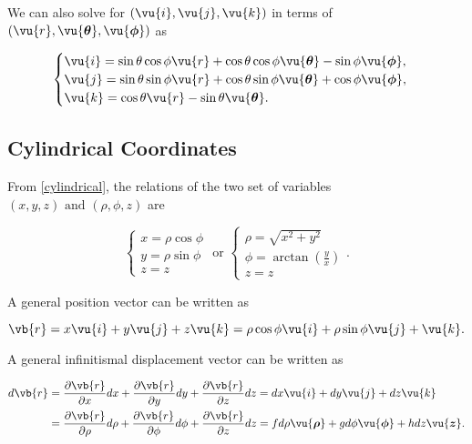 \documentclass[english,a4paper,12pt]{report}
\begin{document}
We can also solve for \((\vu{i} , \vu{j}, \vu{k} )\) in terms of \((\vu{r} , \vu{\boldsymbol{\theta } }, \vu{\boldsymbol{\phi } } )\) as  

\begin{equation}
    \begin{cases}
        \vu{i} = \sin \theta \cos \phi \vu{r} + \cos \theta \cos \phi \vu{\boldsymbol{\theta } } - \sin \phi \vu{\boldsymbol{\phi } }, \\
        \vu{j} = \sin \theta \sin \phi \vu{r} + \cos \theta \sin \phi \vu{\boldsymbol{\theta } } + \cos \phi \vu{\boldsymbol{\phi } }, \\
        \vu{k} = \cos \theta \vu{r} - \sin \theta \vu{\boldsymbol{\theta } }.
    \end{cases}
\end{equation}



	
\subsection{Cylindrical Coordinates}

From \cref{cylindrical}, the relations of the two set of variables \((x,y,z) \text { and } (\rho , \phi , z)\)  are

\begin{equation}
    \begin{cases} x = \rho \cos \phi \\ y = \rho \sin \phi \\ z = z \end{cases} \text { or } \begin{cases} \rho  = \sqrt{x^2+y^2} \\ \displaystyle \phi = \arctan {\left( \frac{y}{x}  \right)} \\ z = z \end{cases}. 
\end{equation}

A general position vector can be written as 

\begin{equation}
    \vb{r} = x \vu{i} + y \vu{j} + z \vu{k} = \rho \cos \phi  \vu{i} + \rho \sin \phi \vu{j} + \vu{k} .
\end{equation}

A general infinitismal displacement vector can be written as 

\begin{equation}
    \begin{aligned}
    d \vb{r} &= \frac{\partial \vb{r} }{\partial x} dx + \frac{\partial \vb{r} }{\partial y} dy + \frac{\partial \vb{r} }{\partial z} dz = dx \vu{i} + dy \vu{j} + dz \vu{k} \\ &= \frac{\partial \vb{r} }{\partial \rho } d\rho  + \frac{\partial \vb{r} }{\partial \phi  }d \phi  + \frac{\partial \vb{r} }{\partial z}d z =f d \rho  \vu{\boldsymbol{\rho } }  +g d\phi \vu{\boldsymbol{\phi  } } +h  d z\vu{\boldsymbol{z} }. 
    \end{aligned}
\end{equation}
\end{document}
